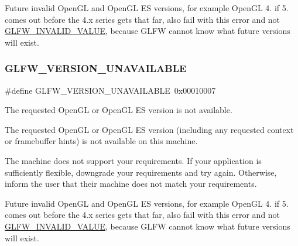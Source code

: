 \begin{DoxyParagraph}{}
Future invalid Open\+GL and Open\+GL ES versions, for example Open\+GL 4. if 5. comes out before the 4.\+x series gets that far, also fail with this error and not \hyperlink{group__errors_gaaf2ef9aa8202c2b82ac2d921e554c687}{G\+L\+F\+W\+\_\+\+I\+N\+V\+A\+L\+I\+D\+\_\+\+V\+A\+L\+UE}, because G\+L\+FW cannot know what future versions will exist. 
\end{DoxyParagraph}
\mbox{\label{group__errors_gad16c5565b4a69f9c2a9ac2c0dbc89462}} 
\subsubsection{\texorpdfstring{G\+L\+F\+W\+\_\+\+V\+E\+R\+S\+I\+O\+N\+\_\+\+U\+N\+A\+V\+A\+I\+L\+A\+B\+LE}{GLFW\_VERSION\_UNAVAILABLE}\hspace{0.1cm}{\footnotesize\ttfamily [3/5]}}
{\footnotesize\ttfamily \#define G\+L\+F\+W\+\_\+\+V\+E\+R\+S\+I\+O\+N\+\_\+\+U\+N\+A\+V\+A\+I\+L\+A\+B\+LE~0x00010007}



The requested Open\+GL or Open\+GL ES version is not available. 

The requested Open\+GL or Open\+GL ES version (including any requested context or framebuffer hints) is not available on this machine.

The machine does not support your requirements. If your application is sufficiently flexible, downgrade your requirements and try again. Otherwise, inform the user that their machine does not match your requirements.

\begin{DoxyParagraph}{}
Future invalid Open\+GL and Open\+GL ES versions, for example Open\+GL 4. if 5. comes out before the 4.\+x series gets that far, also fail with this error and not \hyperlink{group__errors_gaaf2ef9aa8202c2b82ac2d921e554c687}{G\+L\+F\+W\+\_\+\+I\+N\+V\+A\+L\+I\+D\+\_\+\+V\+A\+L\+UE}, because G\+L\+FW cannot know what future versions will exist. 
\end{DoxyParagraph}
\mbox{\label{group__errors_gad16c5565b4a69f9c2a9ac2c0dbc89462}} 
